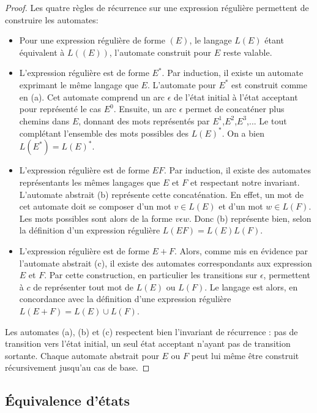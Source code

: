 \begin{proof}
	Les quatre règles de récurrence sur une expression régulière permettent de construire les automates:
	\begin{itemize}
		\item Pour une expression régulière de forme $(E)$, le langage $L(E)$ étant équivalent à $L((E))$, l'automate construit pour $E$ reste valable.
		\item L'expression régulière est de forme $E^*$. Par induction, il existe un automate exprimant le même langage que $E$. L'automate pour $E^*$ est construit comme en (a). Cet automate comprend un arc $\epsilon$ de l'état initial à l'état acceptant pour représenté le cas $E^0$. Ensuite, un arc $\epsilon$ permet de concaténer plus chemins dans $E$, donnant des mots représentés par $E^1$,$E^2$,$E^3$,... Le tout complétant l'ensemble des mots possibles des $L(E)^*$. On a bien $L(E^*)=L(E)^*$.
		\item L'expression régulière est de forme $EF$. Par induction, il existe des automates représentants les mêmes langages que $E$ et $F$ et respectant notre invariant. L'automate abstrait (b) représente cette concaténation. En effet, un mot de cet automate doit se composer d'un mot $v\in L(E)$ et d'un mot $w \in L(F)$. Les mots possibles sont alors de la forme $v\epsilon w$. Donc (b) représente bien, selon la définition d'un expression régulière $L(EF)=L(E)L(F)$.
		\item L'expression régulière est de forme $E+F$. Alors, comme mis en évidence par l'automate abstrait (c), il existe des automates correspondants aux expression $E$ et $F$. Par cette construction, en particulier les transitions sur $\epsilon$, permettent à $c$ de représenter tout mot de $L(E)$ ou $L(F)$. Le langage est alors, en concordance avec la définition d'une expression régulière $L(E+F)=L(E)\cup L(F)$.
	\end{itemize}
	
	Les automates (a), (b) et (c) respectent bien l'invariant de récurrence : pas de transition vers l'état initial, un seul état acceptant n'ayant pas de transition sortante. Chaque automate abstrait pour $E$ ou $F$ peut lui même être construit récursivement jusqu'au cas de base.
	
\end{proof}




\subsection{Équivalence d'états}\label{ss:tfa}
	 
